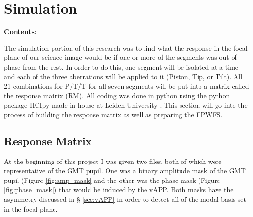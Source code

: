 
\chapter{Simulation} %

\noindent\textbf{\large Contents:}

\noindent\hrulefill
\noindent\startcontents[chapters]
\noindent{}
\noindent\hrulefill

\label{Chapter2}%

The simulation portion of this research was to find what the response in the focal plane of our science image would
be if one or more of the segments was out of phase from the rest.  In order to do this, one segment will be isolated
at a time and each of the three aberrations will be applied to it (Piston, Tip, or Tilt).  All 21 combinations for
P/T/T for all seven segments will be put into a matrix called the response matrix (RM).  All coding was done in
python using the python package HCIpy made in house at Leiden University \cite{por2018hcipy}.  This section will go
into the process of building the response matrix as well as preparing the FPWFS.


\section{Response Matrix}
\label{sec:RM}

At the beginning of this project I was given two files, both of which were representative of the GMT pupil.  One was
a binary amplitude mask of the GMT pupil (Figure \ref{fig:amp_mask} and the other was the phase mask (Figure
\ref{fig:phase_mask}) that would be induced by the vAPP.  Both masks have the asymmetry discussed in \S
\ref{sec:vAPP} in order to detect all of the modal basis set in the focal plane.

